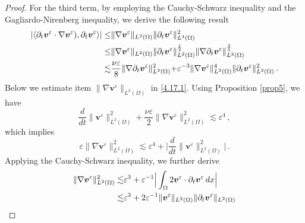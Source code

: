 \documentclass[10pt,a4paper]{amsart}
\begin{document}
\begin{proof}
	
	For the third term, by employing the Cauchy-Schwarz inequality and the Gagliardo-Nirenberg inequality, we derive the following result
	\begin{align}\label{4.17.1}
		|\langle
		\partial_t{\boldsymbol v}^{\varepsilon} \cdot \nabla\boldsymbol{v}^\varepsilon)
		,\partial_t{\boldsymbol v}^{\varepsilon}\rangle|
		\leq
		&\lVert
		\nabla{\boldsymbol v}^{\varepsilon} 	\rVert_{{L}^2(\Omega)}
		\lVert
		\partial_t{\boldsymbol v}^{\varepsilon} 	\rVert^2_{{L}^4(\Omega)}
		\notag\\
		\leq &
		\lVert\nabla{\boldsymbol v}^{\varepsilon} 	\rVert_{{L}^2(\Omega)}
		\lVert
		\partial_t{\boldsymbol v}^{\varepsilon} 	\rVert^{\frac12}_{{L}^2(\Omega)}
		\lVert
		\nabla\partial_t{\boldsymbol v}^{\varepsilon} 	\rVert^{\frac32}_{{L}^2(\Omega)}
		\notag\\
		\lesssim&
		\frac{\nu\varepsilon}{8}
		\rVert
		\nabla\partial_t{\boldsymbol v}^{\varepsilon} 	\lVert^{2}_{{L}^2(\Omega)}
		+
		\varepsilon^{-3}
		\lVert\nabla{\boldsymbol v}^{\varepsilon} 	\rVert^4_{{L}^2(\Omega)}
		\lVert
		\partial_t{\boldsymbol v}^{\varepsilon} 	\rVert^{2}_{{L}^2(\Omega)}
		\,.
	\end{align}
	Below we estimate item $\lVert\nabla{\boldsymbol v}^{\varepsilon} 	\rVert_{{L}^2(\Omega)}$ in \eqref{4.17.1}. Using Proposition \ref{prop5}, we have  
	\begin{equation*}
		\frac{d}{dt}\lVert\boldsymbol v^{\varepsilon}\rVert^2_{{L}^2(\Omega)}
		+\frac{\nu\varepsilon}{2}
		\lVert\nabla\boldsymbol v^{\varepsilon}\rVert^2_{{L}^2(\Omega)} \lesssim \varepsilon^4 \,,
	\end{equation*}
	which implies  
	\begin{equation*}
		\varepsilon\lVert\nabla\boldsymbol v^{\varepsilon}\rVert^2_{{L}^2(\Omega)} \lesssim \varepsilon^4 
		+\Big|
		\frac{d}{dt}\lVert\boldsymbol v^{\varepsilon}\rVert^2_{{L}^2(\Omega)}
		\Big|\,.
	\end{equation*} 
	Applying the Cauchy-Schwarz inequality, we further derive 
	\begin{align}\label{3.1.1}
		\lVert\nabla\boldsymbol v^{\varepsilon}\rVert^2_{{L}^2(\Omega)} \lesssim
		& \varepsilon^3 
		+\varepsilon^{-1}\Big|
		\int_{\Omega} 2 \boldsymbol v^{\varepsilon} \cdot {\partial_t}\boldsymbol v^{\varepsilon} \, dx
		\Big|\notag\\
		\lesssim&\varepsilon^3 
		+
		2\varepsilon^{-1}\lVert\boldsymbol v^{\varepsilon}\rVert_{{L}^2(\Omega)}
		\lVert\partial_t\boldsymbol v^{\varepsilon}\rVert_{{L}^2(\Omega)}\notag\\

\end{align}
\end{proof}
\end{document}
